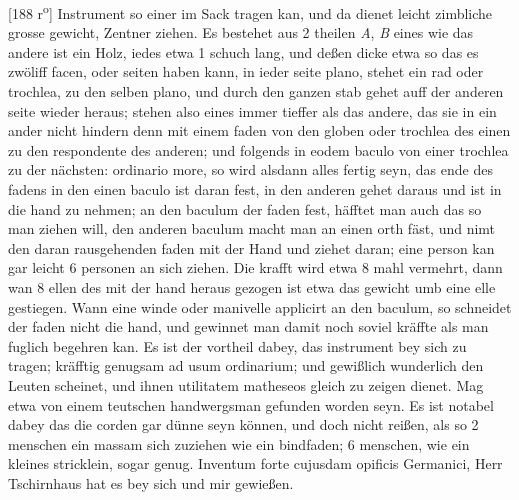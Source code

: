         \vspace*{8mm}
        \pstart 
        \normalsize
      [188 r\textsuperscript{o}] Instrument so einer im Sack tragen kan, und da dienet leicht zimbliche grosse gewicht,  Zentner ziehen. Es bestehet aus 2 theilen \textit{A}, \textit{B} eines wie das andere ist ein Holz, iedes etwa 1 schuch lang, und deßen dicke etwa so das es zw\"{o}liff facen, oder seiten haben kann, in ieder seite plano, stehet ein rad oder trochlea\protect{},  zu den selben plano, und durch den ganzen stab gehet auff der anderen seite wieder heraus;  stehen also eines immer tieffer als das andere, das sie in ein ander nicht hindern denn mit einem faden  von den globen oder trochlea\protect{} des einen  zu den respondente des anderen; und folgends in eodem baculo von einer trochlea\protect{} zu der n\"{a}chsten: ordinario more, so wird alsdann alles fertig seyn, das ende des fadens in den einen baculo ist daran fest, in den anderen gehet daraus und ist in die hand zu nehmen; an den baculum  der faden fest, h\"{a}fftet man auch das  so man ziehen will, den anderen baculum macht man an einen orth f\"{a}st, und nimt den daran rausgehenden faden mit der Hand und ziehet daran; eine person kan gar leicht 6 personen an sich ziehen. Die krafft wird etwa 8 mahl vermehrt, dann wan 8 ellen des  mit der hand heraus gezogen ist etwa das gewicht umb eine elle gestiegen. Wann eine winde oder manivelle applicirt an den baculum, so schneidet der faden nicht die hand, und gewinnet man damit noch soviel kr\"{a}ffte als man fuglich begehren kan. Es ist der vortheil dabey, das instrument bey sich zu tragen; kr\"{a}fftig genugsam ad usum ordinarium; und gewißlich wunderlich den Leuten scheinet, und ihnen utilitatem matheseos gleich zu zeigen dienet. Mag etwa von einem teutschen handwergsman gefunden worden seyn. Es ist notabel dabey das die corden gar d\"{u}nne seyn k\"{o}nnen, und doch nicht reißen, als so 2 menschen ein massam sich zuziehen wie ein bindfaden; 6 menschen, wie ein kleines stricklein, sogar genug. Inventum forte cujusdam opificis Germanici, Herr Tschirnhaus\protect{} hat es bey sich und mir gewießen.
